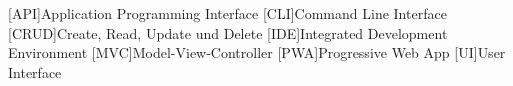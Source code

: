 \begin{acronym}[MMMMMM]
 
 	[API]{Application Programming Interface}
	[CLI]{Command Line Interface}
	[CRUD]{Create, Read, Update und Delete}
	[IDE]{Integrated Development Environment}
	[MVC]{Model-View-Controller}
	[PWA]{Progressive Web App}
	[UI]{User Interface}
	
	
\end{acronym}
